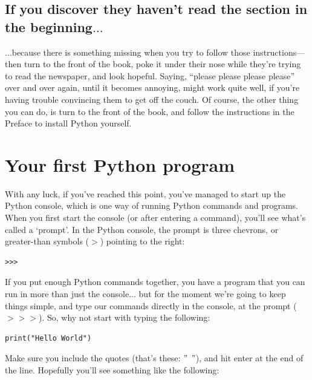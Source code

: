 \subsection*{\color{BrickRed}If you discover they haven't read the section in the beginning$\ldots$}

$\ldots$because there is something missing when you try to follow those instructions---then turn to the front of the book, poke it under their nose while they're trying to read the newspaper, and look hopeful.  Saying, ``please please please please'' over and over again, until it becomes annoying, might work quite well, if you're having trouble convincing them to get off the couch.  Of course, the other thing you can do, is turn to the front of the book, and follow the instructions in the Preface to install Python yourself.

\section{Your first Python program}

With any luck, if you've reached this point, you've managed to start up the Python console, which is one way of running Python commands and programs.  When you first start the console (or after entering a command), you'll see what's called a `prompt'.  In the Python console, the prompt is three chevrons, or greater-than symbols ($>$) pointing to the right:

\begin{listing}
\begin{verbatim}
>>>
\end{verbatim}
\end{listing}

If you put enough Python commands together, you have a program that you can run in more than just the console$\ldots$ but for the moment we're going to keep things simple, and type our commands directly in the console, at the prompt ($>>>$).  So, why not start with typing the following:

\begin{listing}
\begin{verbatim}
print("Hello World")
\end{verbatim}
\end{listing}

Make sure you include the quotes (that's these: $"$ $"$), and hit enter at the end of the line.  Hopefully you'll see something like the following:

